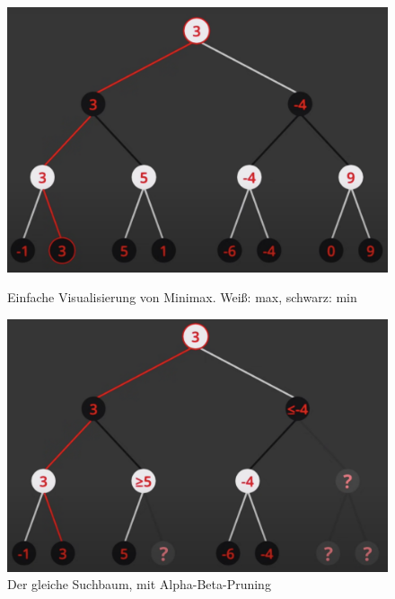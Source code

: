 \documentclass{jpp}
\begin{document}
\begin{figure}
  \centering
  \begin{minipage}[b]{0.49\textwidth}
    \includegraphics[width=\textwidth]{imgs/MM.png}
    \caption{Einfache Visualisierung von Minimax. Weiß: max, schwarz: min}
    \label{fig:minimax}
  \end{minipage}
  \hfill
  \begin{minipage}[b]{0.49\textwidth}
    \includegraphics[width=\textwidth]{imgs/ABP.png}
    \caption{Der gleiche Suchbaum, mit Alpha-Beta-Pruning}
    \label{fig:alphabeta}
  \end{minipage}
\end{figure}
\end{document}
